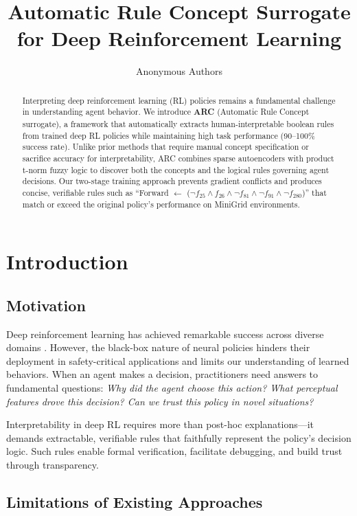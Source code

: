 \documentclass[11pt,twocolumn]{article}
\title{\textbf{Automatic Rule Concept Surrogate for Deep Reinforcement Learning}}
\author{Anonymous Authors}
\date{}
\begin{document}
\maketitle

\begin{abstract}
Interpreting deep reinforcement learning (RL) policies remains a fundamental challenge in understanding agent behavior. We introduce \textbf{ARC} (Automatic Rule Concept surrogate), a framework that automatically extracts human-interpretable boolean rules from trained deep RL policies while maintaining high task performance (90--100\% success rate). Unlike prior methods that require manual concept specification or sacrifice accuracy for interpretability, ARC combines sparse autoencoders with product t-norm fuzzy logic to discover both the concepts and the logical rules governing agent decisions. Our two-stage training approach prevents gradient conflicts and produces concise, verifiable rules such as ``Forward $\leftarrow$ ($\lnot f_{25} \land f_{26} \land \lnot f_{81} \land \lnot f_{91} \land \lnot f_{280}$)'' that match or exceed the original policy's performance on MiniGrid environments.
\end{abstract}

\section{Introduction}

\subsection{Motivation}

Deep reinforcement learning has achieved remarkable success across diverse domains \cite{silver2016alphago,mnih2015human}. However, the black-box nature of neural policies hinders their deployment in safety-critical applications and limits our understanding of learned behaviors. When an agent makes a decision, practitioners need answers to fundamental questions: \emph{Why did the agent choose this action? What perceptual features drove this decision? Can we trust this policy in novel situations?}

Interpretability in deep RL requires more than post-hoc explanations—it demands extractable, verifiable rules that faithfully represent the policy's decision logic. Such rules enable formal verification, facilitate debugging, and build trust through transparency.

\subsection{Limitations of Existing Approaches}
\end{document}
